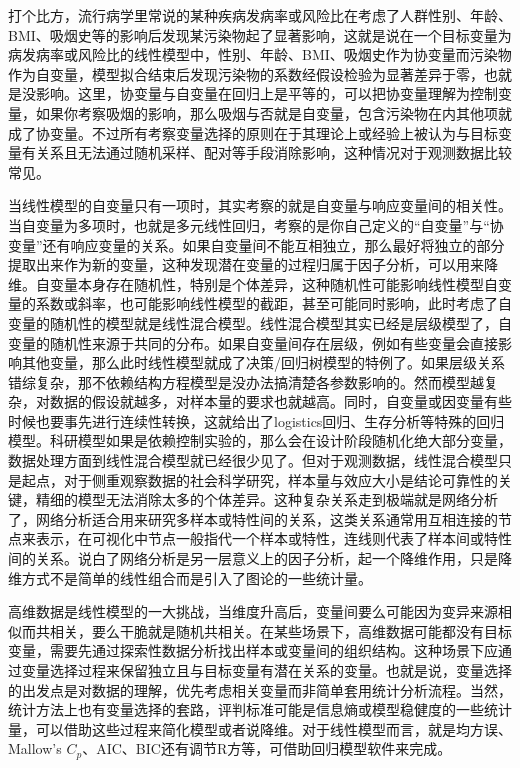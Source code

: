 \documentclass[]{tufte-book}
\begin{document}
打个比方，流行病学里常说的某种疾病发病率或风险比在考虑了人群性别、年龄、BMI、吸烟史等的影响后发现某污染物起了显著影响，这就是说在一个目标变量为病发病率或风险比的线性模型中，性别、年龄、BMI、吸烟史作为协变量而污染物作为自变量，模型拟合结束后发现污染物的系数经假设检验为显著差异于零，也就是没影响。这里，协变量与自变量在回归上是平等的，可以把协变量理解为控制变量，如果你考察吸烟的影响，那么吸烟与否就是自变量，包含污染物在内其他项就成了协变量。不过所有考察变量选择的原则在于其理论上或经验上被认为与目标变量有关系且无法通过随机采样、配对等手段消除影响，这种情况对于观测数据比较常见。

当线性模型的自变量只有一项时，其实考察的就是自变量与响应变量间的相关性。当自变量为多项时，也就是多元线性回归，考察的是你自己定义的``自变量''与``协变量''还有响应变量的关系。如果自变量间不能互相独立，那么最好将独立的部分提取出来作为新的变量，这种发现潜在变量的过程归属于因子分析，可以用来降维。自变量本身存在随机性，特别是个体差异，这种随机性可能影响线性模型自变量的系数或斜率，也可能影响线性模型的截距，甚至可能同时影响，此时考虑了自变量的随机性的模型就是线性混合模型。线性混合模型其实已经是层级模型了，自变量的随机性来源于共同的分布。如果自变量间存在层级，例如有些变量会直接影响其他变量，那么此时线性模型就成了决策/回归树模型的特例了。如果层级关系错综复杂，那不依赖结构方程模型是没办法搞清楚各参数影响的。然而模型越复杂，对数据的假设就越多，对样本量的要求也就越高。同时，自变量或因变量有些时候也要事先进行连续性转换，这就给出了logistics回归、生存分析等特殊的回归模型。科研模型如果是依赖控制实验的，那么会在设计阶段随机化绝大部分变量，数据处理方面到线性混合模型就已经很少见了。但对于观测数据，线性混合模型只是起点，对于侧重观察数据的社会科学研究，样本量与效应大小是结论可靠性的关键，精细的模型无法消除太多的个体差异。这种复杂关系走到极端就是网络分析了，网络分析适合用来研究多样本或特性间的关系，这类关系通常用互相连接的节点来表示，在可视化中节点一般指代一个样本或特性，连线则代表了样本间或特性间的关系。说白了网络分析是另一层意义上的因子分析，起一个降维作用，只是降维方式不是简单的线性组合而是引入了图论的一些统计量。

高维数据是线性模型的一大挑战，当维度升高后，变量间要么可能因为变异来源相似而共相关，要么干脆就是随机共相关。在某些场景下，高维数据可能都没有目标变量，需要先通过探索性数据分析找出样本或变量间的组织结构。这种场景下应通过变量选择过程来保留独立且与目标变量有潜在关系的变量。也就是说，变量选择的出发点是对数据的理解，优先考虑相关变量而非简单套用统计分析流程。当然，统计方法上也有变量选择的套路，评判标准可能是信息熵或模型稳健度的一些统计量，可以借助这些过程来简化模型或者说降维。对于线性模型而言，就是均方误、Mallow's \(C_p\)、AIC、BIC还有调节R方等，可借助回归模型软件来完成。
\end{document}
